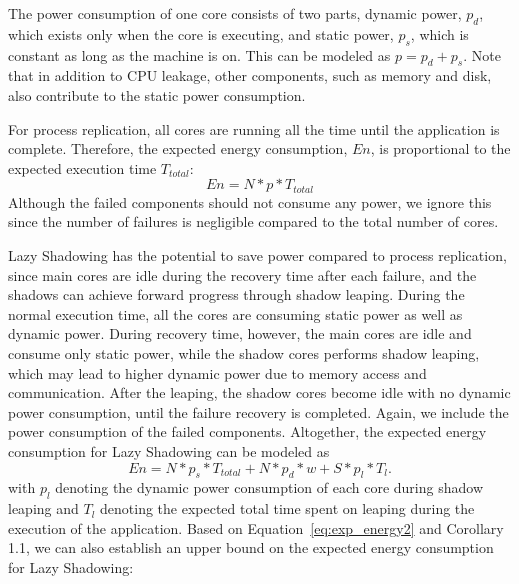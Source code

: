 The power consumption of one core consists of two parts, dynamic power, $p_d$, which exists only when the core is executing, and static power, $p_s$, which is constant as long as the machine is on. This can be modeled as $p = p_d + p_s$. Note that in addition to CPU leakage, other components, such as memory and disk, also contribute to the static power consumption. 

For process replication, all cores are running all the time until the application is complete. Therefore, the expected energy consumption, $En$, is proportional to the expected execution time $T_{total}$: 
\begin{equation}
En = N * p * T_{total}
\label{eq:exp_energy1}
\end{equation} 
Although the failed components should not consume any power, we ignore this since the number of failures is negligible compared to the total number of cores.

Lazy Shadowing has the potential to save power compared to process replication, since main cores are idle during the recovery time after each failure, and the shadows can achieve forward progress through shadow leaping. During the normal execution time, all the cores are consuming static power as well as dynamic power. During recovery time, however, the main cores are idle and consume only static power, while the shadow cores performs shadow leaping, which may lead to higher dynamic power due to memory access and communication. After the leaping, the shadow cores become idle with no dynamic power consumption, until the failure recovery is completed. Again, we include the power consumption of the failed components. Altogether, the expected energy consumption for Lazy Shadowing can be modeled as 
\begin{equation}
En = N * p_s * T_{total} + N * p_d * w + S * p_{l} * T_l.
\label{eq:exp_energy2}
\end{equation}
with $p_{l}$ denoting the dynamic power consumption of each core during shadow leaping and $T_l$ denoting the expected total time spent on leaping during the execution of the application. Based on Equation~\ref{eq:exp_energy2} and Corollary 1.1, we can also establish an upper bound on the expected energy consumption for Lazy Shadowing:

